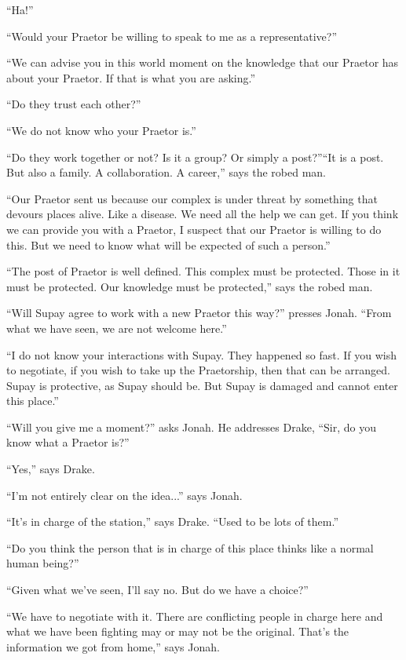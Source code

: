 ``Ha!''

``Would your Praetor be willing to speak to me as a representative?''

``We can advise you in this world moment on the knowledge that our Praetor has about your Praetor.  If that is what you are asking.''

``Do they trust each other?''

``We do not know who your Praetor is.''

``Do they work together or not?  Is it a group?  Or simply a post?''``It is a post. But also a family.  A collaboration.  A career,'' says the robed man.

``Our Praetor sent us because our complex is under threat by something that devours places alive.  Like a disease. We need all the help we can get.  If you think we can provide you with a Praetor, I suspect that our Praetor is willing to do this.  But we need to know what will be expected of such a person.''

``The post of Praetor is well defined.  This complex must be protected.  Those in it must be protected.  Our knowledge must be protected,'' says the robed man.

``Will Supay agree to work with a new Praetor this way?'' presses Jonah.  ``From what we have seen, we are not welcome here.''

``I do not know your interactions with Supay. They happened so fast.  If you wish to negotiate, if you wish to take up the Praetorship, then that can be arranged.  Supay is protective, as Supay should be.  But Supay is damaged and cannot enter this place.''

``Will you give me a moment?'' asks Jonah.  He addresses Drake, ``Sir, do you know what a Praetor is?''

``Yes,'' says Drake.

``I'm not entirely clear on the idea...'' says Jonah.

``It's in charge of the station,'' says Drake.  ``Used to be lots of them.''

``Do you think the person that is in charge of this place thinks like a normal human being?''

``Given what we've seen, I'll say no.  But do we have a choice?''

``We have to negotiate with it.  There are conflicting people in charge here and what we have been fighting may or may not be the original. That's the information we got from home,'' says Jonah. 



